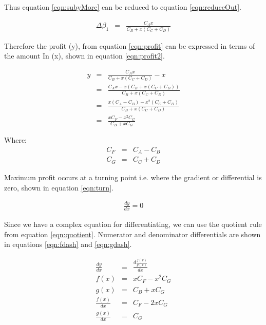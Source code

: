\documentclass[runningheads]{llncs}
\begin{document}
	Thus equation \ref{eqn:subyMore} can be reduced to equation \ref{eqn:reduceOut}.
	
	\begin{eqnarray}
		\Delta\beta_{1}  &=& \frac{C_{A} x}{C_{B} + x(C_{C} + C_{D})} \label{eqn:reduceOut}
	\end{eqnarray}
	
	Therefore the profit (y), from equation \ref{eqn:profit} can be expressed in terms of the amount In (x), shown in equation \ref{eqn:profit2}.
	
	\begin{eqnarray}
		y  &=& \frac{C_{A} x}{C_{B} + x(C_{C} + C_{D})} - x \label{eqn:profit2}\\
		&=& \frac{C_{A} x - x(C_{B} + x(C_{C} + C_{D}))}{C_{B} + x(C_{C} + C_{D})} \label{eqn:profit3}\\
		&=& \frac{x(C_{A} - C_{B}) - x^2(C_{C} + C_{D})}{C_{B} + x(C_{C} + C_{D})} \label{eqn:profit4}\\
		&=& \frac{x C_{F} - x^2 C_{G} }{C_{B} + x C_{G}} \label{eqn:profit5}
	\end{eqnarray}
	
	Where:
	\begin{eqnarray}
		C_{F}  &=& C_{A} - C_{B}\\
		C_{G}  &=& C_{C} + C_{D}
	\end{eqnarray}
	
	Maximum profit occurs at a turning point i.e. where the gradient or differential is zero, shown in equation \ref{eqn:turn}.
	
	\begin{eqnarray}
		\frac{dy}{dx} = 0 \label{eqn:turn}
	\end{eqnarray}
	
	Since we have a complex equation for differentiating, we can use the quotient rule from equation \ref{eqn:quotient}. Numerator and denominator differentials are shown in equations \ref{eqn:fdash} and \ref{eqn:gdash}.
	
	\begin{eqnarray}
		\frac{dy}{dx} &=& \frac{d \frac{ f(x)}{g(x)}}{dx} \label{eqn:turn2}\\
		f(x) &=& x C_{F} - x^2 C_{G} \label{eqn:f}\\
		g(x) &=& C_{B} + x C_{G} \label{eqn:g}\\
		\frac{f(x)}{dx} &=& C_{F} - 2 x C_{G} \label{eqn:fdash}\\
		\frac{g(x)}{dx} &=& C_{G} \label{eqn:gdash}
	\end{eqnarray}
	
\end{document}
